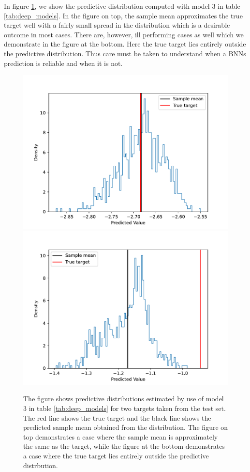 In figure \ref{fig:predictive_distributions}, we show the predictive distribution computed with model 3 in table \ref{tab:deep_models}. In the figure on top, the sample mean approximates the true target well with a fairly small spread in the distribution which is a desirable outcome in most cases. There are, however, ill performing cases as well which we demonstrate in the figure at the bottom. Here the true target lies entirely outside the predictive distribution. Thus care must be taken to understand when a BNNs prediction is reliable and when it is not. 
\begin{figure}[H]
    \centering
    \includegraphics[scale=0.5]{figures/predictive_distributions/predictive_distribution_point_idx_360.pdf}
    \includegraphics[scale=0.5]{figures/predictive_distributions/predictive_distribution_point_idx_2052.pdf}
    \caption{ 
        The figure shows predictive distributions estimated by use of model 3 in table \ref{tab:deep_models} for two targets taken from the test set. The red line shows the true target and the black line shows the predicted sample mean obtained from the distribution. The figure on top demonstrates a case where the sample mean is approximately the same as the target, while the figure at the bottom demonstrates a case where the true target lies entirely outside the predictive distrbution. 
    }
    \label{fig:predictive_distributions}
\end{figure}


